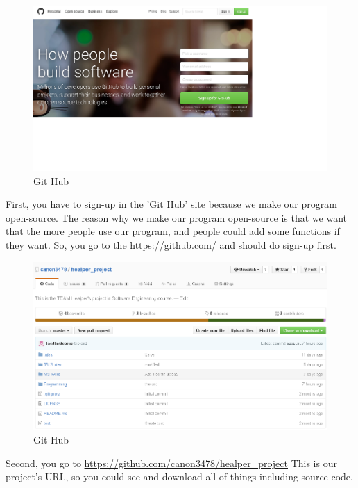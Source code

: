 \documentclass[conference]{IEEEtran}
\begin{document}
\begin{figure}[H]
\begin{center}
    \includegraphics[scale=0.33]{git1}
    \caption{Git Hub} 
\end{center}
\end{figure}

First, you have to sign-up in the 'Git Hub' site because we make our program open-source. The reason why we make our program open-source is that we want that the more people use our program, and people could add some functions if they want. So, you go to the \url{https://github.com/} and should do sign-up first.

\begin{figure}[H]
\begin{center}
    \includegraphics[scale=0.33]{git2}
    \caption{Git Hub} 
\end{center}
\end{figure}

Second, you go to \url{https://github.com/canon3478/healper_project} 
This is our project's URL, so you could see and download all of things including source code.
\end{document}
